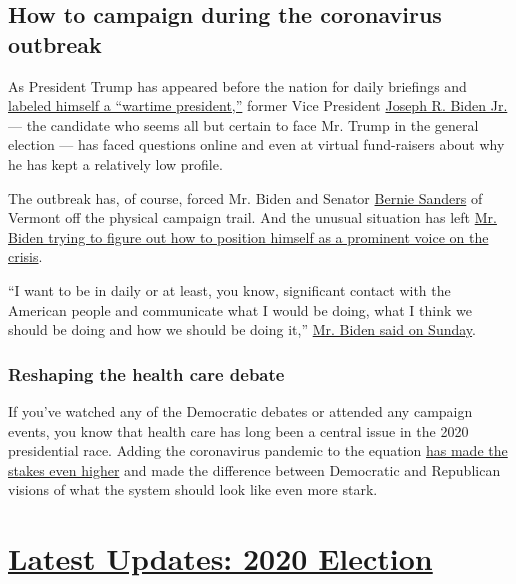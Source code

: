 \hypertarget{how-to-campaign-during-the-coronavirus-outbreak}{%
\subsection{How to campaign during the coronavirus
outbreak}\label{how-to-campaign-during-the-coronavirus-outbreak}}

As President Trump has appeared before the nation for daily briefings
and
\href{https://www.nytimes.com/2020/03/22/us/politics/coronavirus-trump-wartime-president.html}{labeled
himself a ``wartime president,''} former Vice President
\href{https://www.nytimes.com/interactive/2020/us/elections/joe-biden.html}{Joseph
R. Biden Jr.} --- the candidate who seems all but certain to face Mr.
Trump in the general election --- has faced questions online and even at
virtual fund-raisers about why he has kept a relatively low profile.

The outbreak has, of course, forced Mr. Biden and Senator
\href{https://www.nytimes.com/interactive/2020/us/elections/bernie-sanders.html}{Bernie
Sanders} of Vermont off the physical campaign trail. And the unusual
situation has left
\href{https://www.nytimes.com/2020/03/23/us/politics/joe-biden-2020-virus.html}{Mr.
Biden trying to figure out how to position himself as a prominent voice
on the crisis}.

``I want to be in daily or at least, you know, significant contact with
the American people and communicate what I would be doing, what I think
we should be doing and how we should be doing it,''
\href{https://www.nytimes.com/2020/03/22/us/politics/biden-trump-coronavirus.html}{Mr.
Biden said on Sunday}.

\hypertarget{reshaping-the-health-care-debate}{%
\subsubsection{Reshaping the health care
debate}\label{reshaping-the-health-care-debate}}

If you've watched any of the Democratic debates or attended any campaign
events, you know that health care has long been a central issue in the
2020 presidential race. Adding the coronavirus pandemic to the equation
\href{https://www.nytimes.com/2020/03/26/us/politics/coronavirus-health-care.html}{has
made the stakes even higher} and made the difference between Democratic
and Republican visions of what the system should look like even more
stark.

\hypertarget{latest-updates-2020-election}{%
\section{\texorpdfstring{\href{https://www.nytimes.com/2020/07/31/us/elections/biden-vs-trump.html?action=click\&pgtype=Article\&state=default\&region=MAIN_CONTENT_1\&context=storylines_live_updates}{Latest
Updates: 2020
Election}}{Latest Updates: 2020 Election}}\label{latest-updates-2020-election}}

